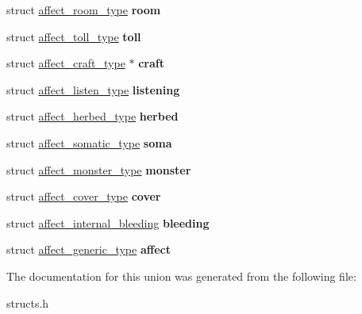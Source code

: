 \begin{DoxyCompactItemize}
\item 
\hypertarget{unionaffected__union_aa7f04e0b35d76e5783d10369d6f607d7}{struct \hyperlink{structaffect__room__type}{affect\-\_\-room\-\_\-type} {\bfseries room}}\label{unionaffected__union_aa7f04e0b35d76e5783d10369d6f607d7}

\item 
\hypertarget{unionaffected__union_a48d27b254d038db067fffab88abc9ac5}{struct \hyperlink{structaffect__toll__type}{affect\-\_\-toll\-\_\-type} {\bfseries toll}}\label{unionaffected__union_a48d27b254d038db067fffab88abc9ac5}

\item 
\hypertarget{unionaffected__union_a0d3cb515a6284521abc165642308d329}{struct \hyperlink{structaffect__craft__type}{affect\-\_\-craft\-\_\-type} $\ast$ {\bfseries craft}}\label{unionaffected__union_a0d3cb515a6284521abc165642308d329}

\item 
\hypertarget{unionaffected__union_a38fd9ada1161469432533e35d96d6a24}{struct \hyperlink{structaffect__listen__type}{affect\-\_\-listen\-\_\-type} {\bfseries listening}}\label{unionaffected__union_a38fd9ada1161469432533e35d96d6a24}

\item 
\hypertarget{unionaffected__union_a55f74c011521f3f0a0aaa8d29e48716e}{struct \hyperlink{structaffect__herbed__type}{affect\-\_\-herbed\-\_\-type} {\bfseries herbed}}\label{unionaffected__union_a55f74c011521f3f0a0aaa8d29e48716e}

\item 
\hypertarget{unionaffected__union_a02145b6a5363511a3ded9c0887f86968}{struct \hyperlink{structaffect__somatic__type}{affect\-\_\-somatic\-\_\-type} {\bfseries soma}}\label{unionaffected__union_a02145b6a5363511a3ded9c0887f86968}

\item 
\hypertarget{unionaffected__union_a3bd426fe92c8bc9bc11f1b7394a26f1a}{struct \hyperlink{structaffect__monster__type}{affect\-\_\-monster\-\_\-type} {\bfseries monster}}\label{unionaffected__union_a3bd426fe92c8bc9bc11f1b7394a26f1a}

\item 
\hypertarget{unionaffected__union_ad30fcc11880dc283492490b4ec44f5a8}{struct \hyperlink{structaffect__cover__type}{affect\-\_\-cover\-\_\-type} {\bfseries cover}}\label{unionaffected__union_ad30fcc11880dc283492490b4ec44f5a8}

\item 
\hypertarget{unionaffected__union_a496df11695c06bebacd5707d3fc6d559}{struct \hyperlink{structaffect__internal__bleeding}{affect\-\_\-internal\-\_\-bleeding} {\bfseries bleeding}}\label{unionaffected__union_a496df11695c06bebacd5707d3fc6d559}

\item 
\hypertarget{unionaffected__union_adb59b2f1681ae8bc3b1ca089e39dd3a0}{struct \hyperlink{structaffect__generic__type}{affect\-\_\-generic\-\_\-type} {\bfseries affect}}\label{unionaffected__union_adb59b2f1681ae8bc3b1ca089e39dd3a0}

\end{DoxyCompactItemize}


The documentation for this union was generated from the following file\-:\begin{DoxyCompactItemize}
\item 
structs.\-h\end{DoxyCompactItemize}

